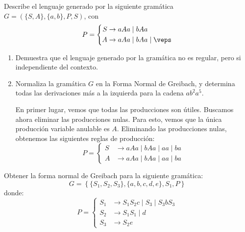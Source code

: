 \begin{ejercicio}\label{ej:1.4.10}
    Describe el lenguaje generado por la siguiente gramática $G = (\{ S, A \}, \{ a, b \}, P, S)$, con
    \begin{equation*}
        P = \left\{
            \begin{aligned}
                S &\rightarrow aAa \mid bAa\\
                A &\rightarrow aAa \mid bAa \mid \veps
            \end{aligned}
        \right.
    \end{equation*}
    \begin{enumerate}
        \item Demuestra que el lenguaje generado por la gramática no es regular, pero si independiente del contexto.
        \item Normaliza la gramática $G$ en la Forma Normal de Greibach, y determina todas las derivaciones más a la izquierda para la cadena $ab^2a^5$.
        
        En primer lugar, vemos que todas las producciones son útiles. Buscamos ahora eliminar las producciones nulas. Para esto, vemos que la única producción variable anulable es $A$. Eliminando las producciones nulas, obtenemos las siguientes reglas de producción:
        \begin{equation*}
            P = \left\{
                \begin{aligned}
                    S &\rightarrow aAa \mid bAa \mid aa \mid ba\\
                    A &\rightarrow aAa \mid bAa \mid aa \mid ba
                \end{aligned}
            \right.
        \end{equation*}
    \end{enumerate}
\end{ejercicio}

\begin{ejercicio}\label{ej:1.4.11}
    Obtener la forma normal de Greibach para la siguiente gramática:
    \begin{equation*}
        G=\left\{ \{ S_1, S_2, S_3 \}, \{ a, b, c, d, e \}, S_1, P \right\}
    \end{equation*}
    donde:
    \begin{equation*}
        P = \left\{
            \begin{aligned}
                S_1 &\rightarrow S_1 S_2 c \mid S_3 \mid S_3 b S_3\\
                S_2 &\rightarrow S_1 S_1 \mid d\\
                S_3 &\rightarrow S_2 e
            \end{aligned}
        \right.
    \end{equation*}
\end{ejercicio}

